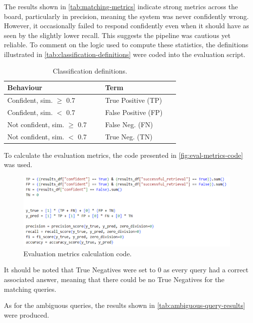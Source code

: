 \documentclass[11pt]{article}
\begin{document}
The results shown in \autoref{tab:matching-metrics} indicate strong metrics across the board, particularly in precision, meaning the system was never confidently wrong. However, it occasionally failed to respond confidently even when it should have as seen by the slightly lower recall. This suggests the pipeline was cautious yet reliable.
To comment on the logic used to compute these statistics, the definitions illustrated in \autoref{tab:classification-definitions} were coded into the evaluation script.

\begin{table}[t]
  \centering
  \begin{tabular}{p{0.50\linewidth}p{0.38\linewidth}}
    \textbf{Behaviour} & \textbf{Term} \\
    \hline
    Confident, sim. $\geq$ 0.7 & True Positive (TP) \\
    Confident, sim. $<$ 0.7 & False Positive (FP) \\
    Not confident, sim. $\geq$ 0.7 & False Neg. (FN) \\
    Not confident, sim. $<$ 0.7 & True Neg. (TN) \\
  \end{tabular}
  \caption{Classification definitions.}
  \label{tab:classification-definitions}
\end{table}

To calculate the evaluation metrics, the code presented in \autoref{fig:eval-metrics-code} was used.

\begin{figure}[t]
  \centering
  \includegraphics[width=\linewidth]{img/eval_metrics_code.png}
  \caption{Evaluation metrics calculation code.}
  \label{fig:eval-metrics-code}
\end{figure}

It should be noted that True Negatives were set to 0 as every query had a correct associated answer, meaning that there could be no True Negatives for the matching queries. 

As for the ambiguous queries, the results shown in \autoref{tab:ambiguous-query-results} were produced.
\end{document}
